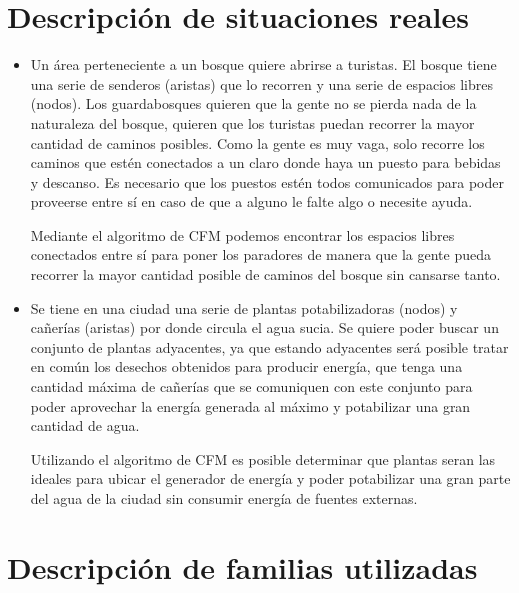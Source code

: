 \documentclass[a4paper, 10pt, twoside]{article}
\begin{document}
\section{Descripción de situaciones reales}
\begin{itemize}
\item Un área perteneciente a un bosque quiere abrirse a turistas. El bosque tiene una serie de senderos (aristas) que lo recorren y una serie de espacios libres (nodos). Los guardabosques quieren que la gente no se pierda nada de la naturaleza del bosque, quieren que los turistas puedan recorrer la mayor cantidad de caminos posibles. Como la gente es muy vaga, solo recorre los caminos que estén conectados a un claro donde haya un puesto para bebidas y descanso. Es necesario que los puestos estén todos comunicados para poder proveerse entre sí en caso de que a alguno le falte algo o necesite ayuda. 

Mediante el algoritmo de CFM podemos encontrar los espacios libres conectados entre sí para poner los paradores de manera que la gente pueda recorrer la mayor cantidad posible de caminos del bosque sin cansarse tanto.

\item Se tiene en una ciudad una serie de plantas potabilizadoras (nodos) y cañerías (aristas) por donde circula el agua sucia. Se quiere poder buscar un conjunto de plantas adyacentes, ya que estando adyacentes será posible tratar en común los desechos obtenidos para producir energía, que tenga una cantidad máxima de cañerías que se comuniquen con este conjunto para poder aprovechar la energía generada al máximo y potabilizar una gran cantidad de agua.

Utilizando el algoritmo de CFM es posible determinar que plantas seran las ideales para ubicar el generador de energía y poder potabilizar una gran parte del agua de la ciudad sin consumir energía de fuentes externas.
\end{itemize}


\newpage
\section{Descripción de familias utilizadas}


\newpage
\end{document}
